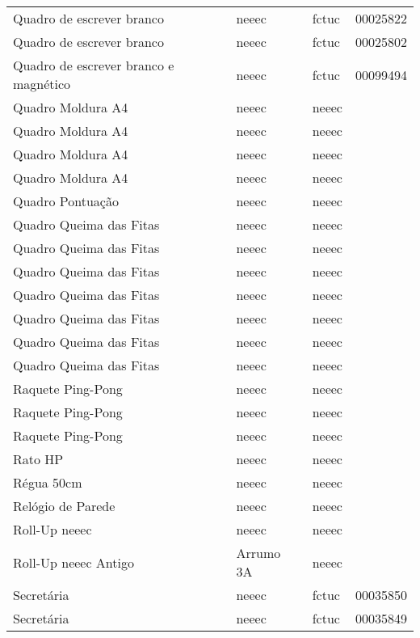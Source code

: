 \begin{longtable}{Xlll}
Quadro de escrever branco & \acrshort{neeec} & \acrshort{fctuc} & 00025822\\
Quadro de escrever branco & \acrshort{neeec} & \acrshort{fctuc} & 00025802\\
Quadro de escrever branco e magnético & \acrshort{neeec} & \acrshort{fctuc} & 00099494\\
Quadro Moldura A4 & \acrshort{neeec} & \acrshort{neeec} & \\
Quadro Moldura A4 & \acrshort{neeec} & \acrshort{neeec} & \\
Quadro Moldura A4 & \acrshort{neeec} & \acrshort{neeec} & \\
Quadro Moldura A4 & \acrshort{neeec} & \acrshort{neeec} & \\
Quadro Pontuação & \acrshort{neeec} & \acrshort{neeec} & \\
Quadro Queima das Fitas & \acrshort{neeec} & \acrshort{neeec} & \\
Quadro Queima das Fitas & \acrshort{neeec} & \acrshort{neeec} & \\
Quadro Queima das Fitas & \acrshort{neeec} & \acrshort{neeec} & \\
Quadro Queima das Fitas & \acrshort{neeec} & \acrshort{neeec} & \\
Quadro Queima das Fitas & \acrshort{neeec} & \acrshort{neeec} & \\
Quadro Queima das Fitas & \acrshort{neeec} & \acrshort{neeec} & \\
Quadro Queima das Fitas & \acrshort{neeec} & \acrshort{neeec} & \\
Raquete Ping-Pong & \acrshort{neeec} & \acrshort{neeec} & \\
Raquete Ping-Pong & \acrshort{neeec} & \acrshort{neeec} & \\
Raquete Ping-Pong & \acrshort{neeec} & \acrshort{neeec} & \\
Rato HP & \acrshort{neeec} & \acrshort{neeec} & \\
Régua 50cm & \acrshort{neeec} & \acrshort{neeec} & \\
Relógio de Parede & \acrshort{neeec} & \acrshort{neeec} & \\
Roll-Up \acrshort{neeec} & \acrshort{neeec} & \acrshort{neeec} & \\
Roll-Up \acrshort{neeec} Antigo & Arrumo 3A & \acrshort{neeec} & \\
Secretária & \acrshort{neeec} & \acrshort{fctuc} & 00035850\\
Secretária & \acrshort{neeec} & \acrshort{fctuc} & 00035849\\

\end{longtable}
